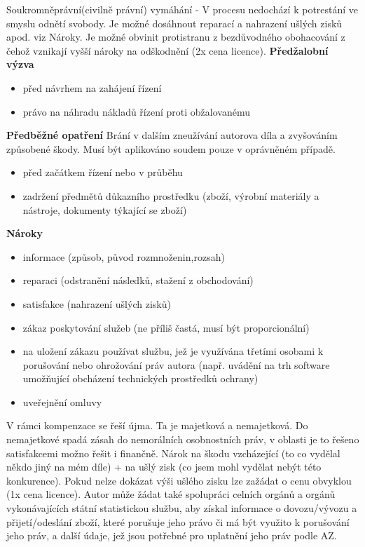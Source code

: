 Soukromněprávní(civilně právní) vymáhání - V procesu nedochází k potrestání ve smyslu odnětí svobody. Je možné dosáhnout reparací a nahrazení ušlých zisků apod. viz Nároky. Je možné obvinit protistranu z bezdůvodného obohacování z čehož vznikají vyšší nároky na odškodnění (2x cena licence).
\newline\textbf{Předžalobní výzva}
\begin{itemize}
        \item před návrhem na zahájení řízení
        \item právo na náhradu nákladů řízení proti obžalovanému
\end{itemize}
\newline\textbf{Předběžné opatření}
Brání v dalším zneužívání autorova díla a zvyšováním způsobené škody. Musí být aplikováno soudem pouze v oprávněném případě.
\begin{itemize}
        \item před začátkem řízení nebo v průběhu
        \item zadržení předmětů důkazního prostředku (zboží, výrobní materiály a nástroje, dokumenty týkající se zboží)
\end{itemize}
\textbf{Nároky}
\begin{itemize}
        \item informace (způsob, původ rozmnoženin,rozsah)
        \item reparaci (odstranění následků, stažení z obchodování)
        \item satisfakce (nahrazení ušlých zisků)
        \item zákaz poskytování služeb (ne příliš častá, musí být proporcionální)
        \item na uložení zákazu používat službu, jež je využívána třetími osobami k porušování nebo ohrožování práv autora (např. uvádění na trh software umožňující obcházení technických prostředků ochrany)
        \item uveřejnění omluvy
\end{itemize}
V rámci kompenzace se řeší újma. Ta je majetková a nemajetková. Do nemajetkové spadá zásah do nemorálních osobnostních práv, v oblasti je to řešeno satisfakcemi možno řešit i finančně.
Nárok na škodu vzcházející (to co vydělal někdo jiný na mém díle) + na ušlý zisk (co jsem mohl vydělat nebýt této konkurence). Pokud nelze dokázat výši ušlého zisku lze zažádat o cenu obvyklou (1x cena licence).
Autor může žádat také spolupráci celních orgánů a orgánů vykonávajících státní statistickou službu,
aby získal informace o dovozu/vývozu a přijetí/odeslání zboží, které porušuje jeho právo či má být
využito k porušování jeho práv, a další údaje, jež jsou potřebné pro uplatnění jeho práv podle AZ.

